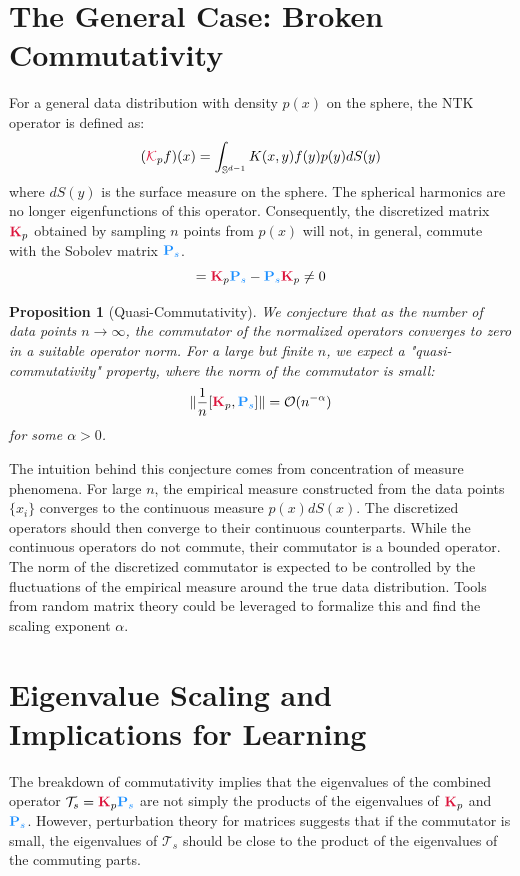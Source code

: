 \documentclass{article}
\newcommand{\K}{\textcolor{kernelcolor}{\mathbf{K}}}
\newcommand{\Ps}{\textcolor{sobolevcolor}{\mathbf{P}_s}}
\newcommand{\Kop}{\textcolor{kernelcolor}{\mathcal{K}}}
\newcommand{\Ts}{\mathcal{T}_s}
\newcommand{\Sphere}{\mathbb{S}^{d-1}}
\newtheorem{proposition}[theorem]{Proposition}
\begin{document}
\section{The General Case: Broken Commutativity}

For a general data distribution with density $p(x)$ on the sphere, the NTK operator is defined as:
\begin{equation}
    (\Kop_p f)(x) = \int_{\Sphere} K(x, y) f(y) p(y) dS(y)
\end{equation}
where $dS(y)$ is the surface measure on the sphere. The spherical harmonics are no longer eigenfunctions of this operator. Consequently, the discretized matrix $\K_p$ obtained by sampling $n$ points from $p(x)$ will not, in general, commute with the Sobolev matrix $\Ps$.
\begin{equation}
    [\K_p, \Ps] = \K_p \Ps - \Ps \K_p \neq 0
\end{equation}

\begin{proposition}[Quasi-Commutativity]
We conjecture that as the number of data points $n \to \infty$, the commutator of the normalized operators converges to zero in a suitable operator norm. For a large but finite $n$, we expect a "quasi-commutativity" property, where the norm of the commutator is small:
\begin{equation}
    \|\frac{1}{n}[\K_p, \Ps]\| = \mathcal{O}(n^{-\alpha})
\end{equation}
for some $\alpha > 0$.
\end{proposition}

The intuition behind this conjecture comes from concentration of measure phenomena. For large $n$, the empirical measure constructed from the data points $\{x_i\}$ converges to the continuous measure $p(x)dS(x)$. The discretized operators should then converge to their continuous counterparts. While the continuous operators do not commute, their commutator is a bounded operator. The norm of the discretized commutator is expected to be controlled by the fluctuations of the empirical measure around the true data distribution. Tools from random matrix theory could be leveraged to formalize this and find the scaling exponent $\alpha$.

\section{Eigenvalue Scaling and Implications for Learning}

The breakdown of commutativity implies that the eigenvalues of the combined operator $\Ts = \K_p \Ps$ are not simply the products of the eigenvalues of $\K_p$ and $\Ps$. However, perturbation theory for matrices suggests that if the commutator is small, the eigenvalues of $\Ts$ should be close to the product of the eigenvalues of the commuting parts.
\end{document}
